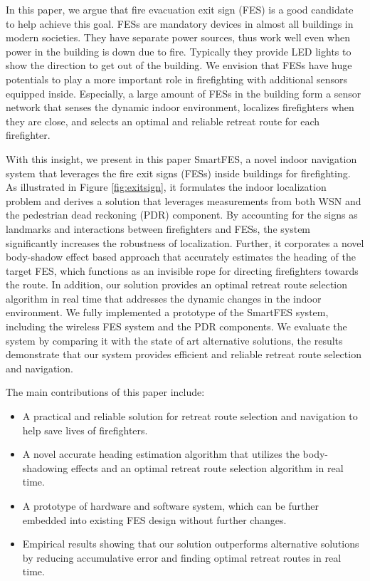 \documentclass[conference]{IEEEtran}
\begin{document}
In this paper, we argue that fire evacuation exit sign (FES) is a good candidate to help achieve this goal. FESs are mandatory devices in almost all buildings in modern societies. They have separate power sources, thus work well even when power in the building is down due to fire. Typically they provide LED lights to show the direction to get out of the building. We envision that FESs have huge potentials to play a more important role in firefighting with additional sensors equipped inside. Especially, a large amount of FESs in the building form a sensor network that senses the dynamic indoor environment, localizes firefighters when they are close, and selects an optimal and reliable retreat route for each firefighter.


With this insight, we present in this paper SmartFES, a novel indoor navigation system that leverages the fire exit signs (FESs) inside buildings for firefighting. As illustrated in Figure \ref{fig:exitsign}, it formulates the indoor localization problem and derives a solution that leverages measurements from both WSN and the pedestrian dead reckoning (PDR) component. By accounting for the signs as landmarks and interactions between firefighters and FESs, the system significantly increases the robustness of localization. Further, it corporates a novel body-shadow effect based approach that accurately estimates the heading of the target FES, which functions as an invisible rope for directing firefighters towards the route. In addition, our solution provides an optimal retreat route selection algorithm in real time that addresses the dynamic changes in the indoor environment. We fully implemented a prototype of the SmartFES system, including the wireless FES system and the PDR components. We evaluate the system by comparing it with the state of art alternative solutions, the results demonstrate that our system provides efficient and reliable retreat route selection and navigation.

The main contributions of this paper include:

  \begin{itemize}
    \item A practical and reliable solution for retreat route selection and navigation to help save lives of firefighters.

    \item A novel accurate heading estimation algorithm that utilizes the body-shadowing effects and an optimal retreat route selection algorithm in real time.

    \item A prototype of hardware and software system, which can be further embedded into existing FES design without further changes.

    \item Empirical results showing that our solution outperforms alternative solutions by reducing accumulative error and finding optimal retreat routes in real time.
  \end{itemize}
  
\end{document}

